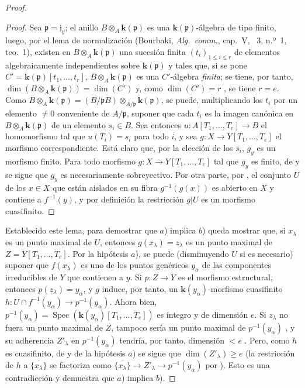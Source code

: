 \begin{proof}
\begin{proof}
Sea $\mathfrak p=\mathfrak j_y$; el anillo $B\otimes_A\boldsymbol{k}(\mathfrak p)$ es una $\boldsymbol{k}(\mathfrak p)$-álgebra de tipo finito, luego, por el lema de normalización (Bourbaki, \emph{Alg.\ comm.}, cap.~V, \textsection~3, n.º~1, teo.~1), existen en $B\otimes_A\boldsymbol{k}(\mathfrak p)$ una sucesión finita $(t_i)_{1\leq i\leq r}$ de elementos algebraicamente independientes sobre $\boldsymbol{k}(\mathfrak p)$ y tales que, si se pone $C'=\boldsymbol{k}(\mathfrak p)[t_1,\ldots,t_r]$, $B\otimes_A\boldsymbol{k}(\mathfrak p)$ es una $C'$-álgebra \emph{finita}; se tiene, por tanto, $\dim(B\otimes_A\boldsymbol{k}(\mathfrak p))=\dim(C')$  y, como $\dim(C')=r$ , se tiene $r=e$.
Como $B\otimes_A\boldsymbol{k}(\mathfrak p)=(B/\mathfrak pB)\otimes_{A/\mathfrak p}\boldsymbol{k}(\mathfrak p)$, se puede, multiplicando los $t_i$ por un elemento $\neq0$
conveniente de $A/\mathfrak p$, suponer que cada $t_i$ es la imagen canónica en $B\otimes_A\boldsymbol{k}(\mathfrak p)$ de un elemento $s_i\in B$.
Sea entonces $u:A[T_1,\ldots,T_e]\to B$ el homomorfismo tal que $u(T_i)=s_i$ para todo $i$, y sea $g:X\to Y[T_1,\ldots,T_e]$ el morfismo correspondiente.
Está claro que, por la elección de los $s_i$, $g_y$ es un morfismo finito.
Para todo morfismo $g:X\to Y[T_1,\ldots,T_e]$ tal que $g_y$ es finito, de  y  se sigue que $g_y$ es necesariamente sobreyectivo.
Por otra parte, por , el conjunto $U$ de los $x\in X$ que están aislados en su fibra $g^{-1}(g(x))$ es abierto en $X$ y contiene a $f^{-1}(y)$, y por definición la restricción $g|U$ es un morfismo cuasifinito.
\end{proof}

Establecido este lema, para demostrar que $a$) implica $b$) queda mostrar que, si $x_\lambda$ es un punto maximal de $U$, entonces $g(x_\lambda)=z_\lambda$ es un punto maximal de $Z=Y[T_1,\ldots,T_e]$.
Por la hipótesis $a$), se puede (disminuyendo $U$ si es necesario) suponer que $f(x_\lambda)$ es uno de los puntos genéricos $y_\alpha$ de las componentes irreducibles de $Y$ que contienen a $y$. Si $p:Z\to Y$ es el morfismo estructural, entonces $p(z_\lambda)=y_\alpha$, y $g$ induce, por tanto, un $\boldsymbol{k}(y_\alpha)$-morfismo cuasifinito
$h:U\cap f^{-1}(y_\alpha)\longrightarrow p^{-1}(y_\alpha)$.
Ahora bien, $p^{-1}(y_\alpha)=\operatorname{Spec}(\boldsymbol{k}(y_\alpha)[T_1,\ldots,T_e])$ es íntegro y de dimensión $e$. Si $z_\lambda$ no fuera un punto maximal de $Z$, tampoco sería un punto maximal de $p^{-1}(y_\alpha)$ , y su adherencia $Z'_\lambda$ en $p^{-1}(y_\alpha)$ tendría, por tanto, dimensión $<e$ . Pero, como $h$ es cuasifinito, de  y de la hipótesis $a$) se sigue que $\dim(Z'_\lambda)\geq e$ (la restricción de $h$ a $\overline{\{x_\lambda\}}$ se factoriza como
$\overline{\{x_\lambda\}}\longrightarrow Z'_\lambda
  \longrightarrow p^{-1}(y_\alpha)$
por ). Esto es una contradicción y demuestra que $a$) implica $b$).


\end{proof}
